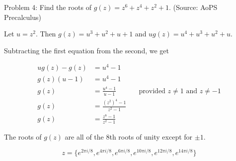Problem 4: Find the roots of $g(z) = z^6 + z^4 + z^2 + 1$. (Source: AoPS Precalculus)

Let $u = z^2$. Then $g(z) = u^3 + u^2 + u + 1$ and $ug(z) = u^4 + u^3 + u^2 + u$. 

Subtracting the first equation from the second, we get

\begin{align*}
ug(z) - g(z) &= u^4 - 1 \\
g(z)(u - 1) &= u^4 - 1 \\
g(z) &= \frac{u^4 - 1}{u - 1} &\quad \text{provided $z \neq 1$ and $z \neq -1$} \\
g(z) &= \frac{(z^2)^4 - 1}{z^2 - 1} \\
g(z) &= \frac{z^8 - 1}{z^2 - 1}
\end{align*}

The roots of $g(z)$ are all of the 8th roots of unity except for $\pm 1$.

$$ \boxed{z = \{e^{2 \pi i / 8}, e^{4 \pi i / 8}, e^{6 \pi i / 8}, e^{10 \pi i / 8}, e^{12 \pi i / 8}, e^{14 \pi i / 8}\}} $$
